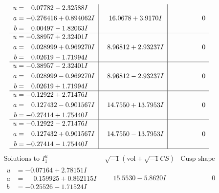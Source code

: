 \documentclass[1p]{elsarticle_modified}
\theoremstyle{definition}
\newcommand{\I}{\sqrt{-1}}
\begin{document}
$$\begin{array}{c|c|c}
\begin{aligned}
u &= \phantom{-}0.07782 - 2.32588 I \\
a &= -0.276416 + 0.894062 I \\
b &= \phantom{-}0.00497 - 1.82063 I\end{aligned}
 & \phantom{-}16.0678 + 3.9170 I & \phantom{-0.000000 } 0 \\ \hline\begin{aligned}
u &= -0.38957 + 2.32401 I \\
a &= \phantom{-}0.028999 + 0.969270 I \\
b &= \phantom{-}0.02619 - 1.71994 I\end{aligned}
 & \phantom{-}8.96812 + 2.93237 I & \phantom{-0.000000 } 0 \\ \hline\begin{aligned}
u &= -0.38957 - 2.32401 I \\
a &= \phantom{-}0.028999 - 0.969270 I \\
b &= \phantom{-}0.02619 + 1.71994 I\end{aligned}
 & \phantom{-}8.96812 - 2.93237 I & \phantom{-0.000000 } 0 \\ \hline\begin{aligned}
u &= -0.12922 + 2.71476 I \\
a &= \phantom{-}0.127432 - 0.901567 I \\
b &= -0.27414 + 1.75440 I\end{aligned}
 & \phantom{-}14.7550 + 13.7953 I & \phantom{-0.000000 } 0 \\ \hline\begin{aligned}
u &= -0.12922 - 2.71476 I \\
a &= \phantom{-}0.127432 + 0.901567 I \\
b &= -0.27414 - 1.75440 I\end{aligned}
 & \phantom{-}14.7550 - 13.7953 I & \phantom{-0.000000 } 0\\
 \hline 
 \end{array}$$\newpage$$\begin{array}{c|c|c}  
\text{Solutions to }I^u_{1}& \I (\text{vol} + \sqrt{-1}CS) & \text{Cusp shape}\\
 \hline 
\begin{aligned}
u &= -0.07164 + 2.78151 I \\
a &= \phantom{-}0.159925 + 0.862115 I \\
b &= -0.25526 - 1.71524 I\end{aligned}
 & \phantom{-}15.5530 - 5.8620 I & \phantom{-0.000000 } 0 \\ \hline\begin{aligned}

\end{aligned}
\end{array}$$
\end{document}
